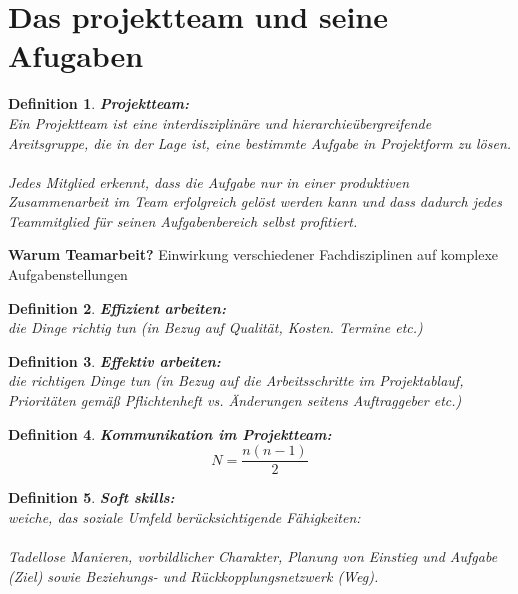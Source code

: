 \documentclass[11pt,a4paper]{article}
\newenvironment{de}[1]
{\begin{mdframed}[style=de]\begin{mydef}{\textbf{#1:}}\\} 
{\end{mydef}\end{mdframed}}
\newtheorem{mydef}{Definition}
\begin{document}
\section{Das projektteam und seine Afugaben}

\begin{de}{Projektteam}
Ein Projektteam ist eine interdisziplinäre und hierarchieübergreifende Areitsgruppe, die in der Lage ist, eine bestimmte Aufgabe in Projektform zu lösen.\\
\\
Jedes Mitglied erkennt, dass die Aufgabe nur in einer produktiven
Zusammenarbeit im Team erfolgreich gelöst werden kann und dass dadurch
jedes Teammitglied für seinen Aufgabenbereich selbst profitiert.
\end{de}
\textbf{Warum Teamarbeit?} Einwirkung verschiedener Fachdisziplinen auf komplexe Aufgabenstellungen

\begin{de}{Effizient arbeiten}
die Dinge richtig tun
(in Bezug auf Qualität, Kosten. Termine etc.)
\end{de}

\begin{de}{Effektiv arbeiten}
die richtigen Dinge tun
(in Bezug auf die Arbeitsschritte im Projektablauf,
Prioritäten gemäß Pflichtenheft vs. Änderungen
seitens Auftraggeber etc.)
\end{de}

\begin{de}{Kommunikation im Projektteam}
$$
N = \frac{n(n-1)}{2}
$$
\end{de}

\begin{de}{Soft skills}
weiche, das soziale Umfeld berücksichtigende Fähigkeiten:\\
\\
Tadellose Manieren, vorbildlicher Charakter, Planung von Einstieg und
Aufgabe (Ziel) sowie Beziehungs- und Rückkopplungsnetzwerk (Weg).
\end{de}
\end{document}

